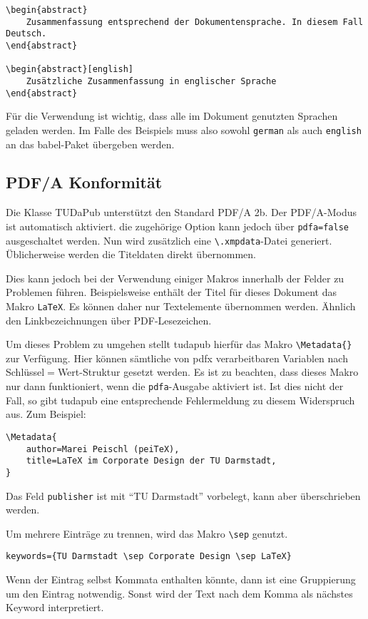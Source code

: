 \documentclass[
	german,
	accentcolor=9c,%
	]{tudapub}
\let\code\texttt
\let\pck\textsf
\let\cls\textsf
\begin{document}
\begin{verbatim}
\begin{abstract}
	Zusammenfassung entsprechend der Dokumentensprache. In diesem Fall Deutsch.
\end{abstract}

\begin{abstract}[english]
	Zusätzliche Zusammenfassung in englischer Sprache
\end{abstract}
\end{verbatim}

Für die Verwendung ist wichtig, dass alle im Dokument genutzten Sprachen geladen werden. Im Falle des Beispiels muss also sowohl \code{german} als auch \code{english} an das \pck{babel}-Paket übergeben werden.


\subsection{PDF/A Konformität}
Die Klasse TUDaPub unterstützt den Standard PDF/A 2b. Der PDF/A-Modus ist automatisch aktiviert. die zugehörige Option kann jedoch über \code{pdfa=false} ausgeschaltet werden.
Nun wird zusätzlich eine \code{\textbackslash.xmpdata}-Datei generiert. Üblicherweise werden die Titeldaten direkt übernommen.

Dies kann jedoch bei der Verwendung einiger Makros innerhalb der Felder zu Problemen führen. Beispielsweise enthält der Titel für dieses Dokument das Makro \code{\LaTeX}. Es können daher nur Textelemente übernommen werden. Ähnlich den Linkbezeichnungen über PDF-Lesezeichen.

Um dieses Problem zu umgehen stellt \cls{tudapub} hierfür das Makro \code{\textbackslash{}Metadata\{\}} zur Verfügung. Hier können sämtliche von \pck{pdfx} verarbeitbaren Variablen nach Schlüssel$=$Wert-Struktur gesetzt werden. Es ist zu beachten, dass dieses Makro nur dann funktioniert, wenn die \code{pdfa}-Ausgabe aktiviert ist. Ist dies nicht der Fall, so gibt \cls{tudapub} eine entsprechende Fehlermeldung zu diesem Widerspruch aus.
Zum Beispiel:
\begin{verbatim}
\Metadata{
	author=Marei Peischl (peiTeX),
	title=LaTeX im Corporate Design der TU Darmstadt,
}
\end{verbatim}
Das Feld \code{publisher} ist mit \enquote{TU Darmstadt} vorbelegt, kann aber überschrieben werden.

Um mehrere Einträge zu trennen, wird das Makro \code{\textbackslash{}sep} genutzt.
\begin{verbatim}
keywords={TU Darmstadt \sep Corporate Design \sep LaTeX}
\end{verbatim}
Wenn der Eintrag selbst Kommata enthalten könnte, dann ist eine Gruppierung um den Eintrag notwendig. Sonst wird der Text nach dem Komma als nächstes Keyword interpretiert.
\end{document}

